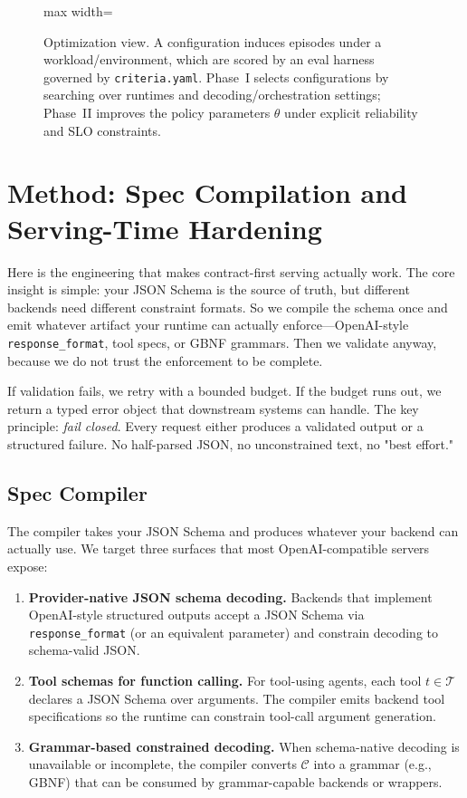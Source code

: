 \documentclass[11pt]{article}
\begin{document}
\begin{figure}[t]
\begin{adjustbox}{max width=\linewidth}
\begin{tikzpicture}
\end{tikzpicture}
\end{adjustbox}
\caption{Optimization view.
A configuration induces episodes under a workload/environment, which are scored by an eval harness governed by \texttt{criteria.yaml}.
Phase~I selects configurations by searching over runtimes and decoding/orchestration settings; Phase~II improves the policy parameters $\theta$ under explicit reliability and SLO constraints.}
\label{fig:optimization-view}
\end{figure}


\section{Method: Spec Compilation and Serving-Time Hardening}
\label{sec:method}

Here is the engineering that makes contract-first serving actually work.
The core insight is simple: your JSON Schema is the source of truth, but different backends need different constraint formats.
So we compile the schema once and emit whatever artifact your runtime can actually enforce---OpenAI-style \texttt{response\_format}, tool specs, or GBNF grammars.
Then we validate anyway, because we do not trust the enforcement to be complete.

If validation fails, we retry with a bounded budget.
If the budget runs out, we return a typed error object that downstream systems can handle.
The key principle: \emph{fail closed}.
Every request either produces a validated output or a structured failure.
No half-parsed JSON, no unconstrained text, no "best effort."

\subsection{Spec Compiler}
\label{sec:spec-compiler}

The compiler takes your JSON Schema and produces whatever your backend can actually use.
We target three surfaces that most OpenAI-compatible servers expose:

\begin{enumerate}[leftmargin=12pt]
    \item \textbf{Provider-native JSON schema decoding.}
    Backends that implement OpenAI-style structured outputs accept a JSON Schema via \texttt{response\_format} (or an equivalent parameter) and constrain decoding to schema-valid JSON.
    \item \textbf{Tool schemas for function calling.}
    For tool-using agents, each tool $t\in\mathcal{T}$ declares a JSON Schema over arguments.
    The compiler emits backend tool specifications so the runtime can constrain tool-call argument generation.
    \item \textbf{Grammar-based constrained decoding.}
    When schema-native decoding is unavailable or incomplete, the compiler converts $\mathcal{C}$ into a grammar (e.g., GBNF) that can be consumed by grammar-capable backends or wrappers.
\end{enumerate}
\end{document}
